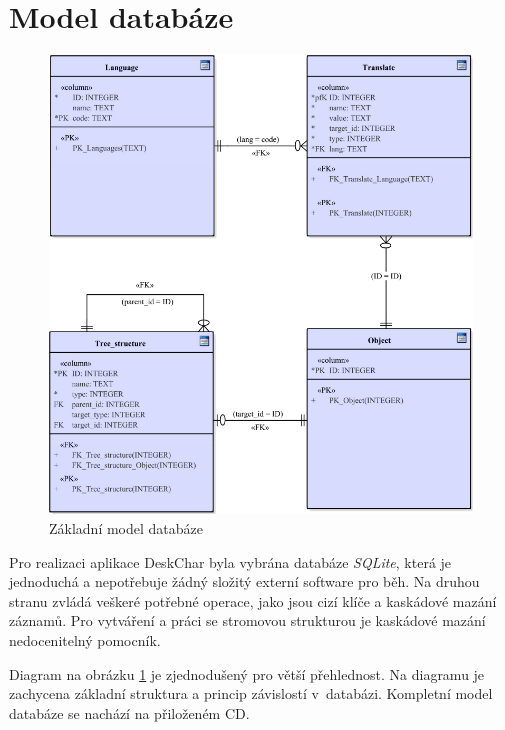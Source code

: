 \documentclass[thesis=B,czech]{resources/FITthesis}[2012/06/26]
\begin{document}
	\section{Model databáze}
	\begin{figure}\centering
	\includegraphics[width=1\textwidth]{images/basic_database}
	\caption[Základní model databáze]{Základní model databáze}\label{fig:db_basic}
	\end{figure}
	Pro realizaci aplikace DeskChar byla vybrána databáze \textit{SQLite}, která je jednoduchá a nepotřebuje žádný složitý externí software pro běh. Na druhou stranu zvládá veškeré potřebné operace, jako jsou cizí klíče a kaskádové mazání záznamů. Pro vytváření a práci se stromovou strukturou je kaskádové mazání nedocenitelný pomocník. \par

Diagram na obrázku \ref{fig:db_basic} je zjednodušený pro větší přehlednost. Na diagramu je zachycena základní struktura a princip závislostí v~databázi. Kompletní model databáze se nachází na přiloženém CD.\par
\end{document}
